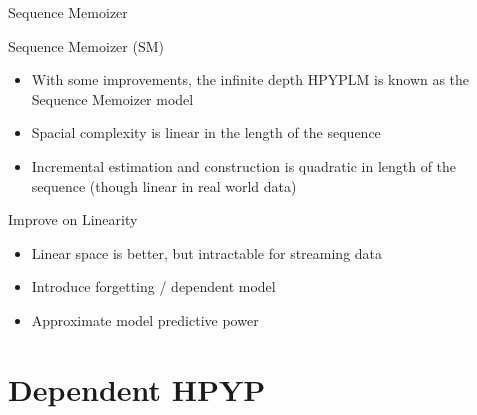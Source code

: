 \documentclass{beamer}
\begin{document}


\begin{frame}[t]{Sequence Memoizer \cite{Wood2009}}
	\begin{block}{Sequence Memoizer (SM)}
		\begin{itemize}
			\item With some improvements, the infinite depth HPYPLM is known as the Sequence Memoizer model \cite{Wood2009}
			\item Spacial complexity is linear in the length of the sequence
			\item Incremental estimation and construction is quadratic in length of the sequence (though linear in real world data) \cite{Gasthaus2010}
		\end{itemize}
	\end{block}

        \begin{block}{Improve on Linearity}
          \begin{itemize}
            \item Linear space is better, but intractable for streaming data
            \item Introduce forgetting / dependent model
            \item Approximate model predictive power
          \end{itemize}
        \end{block}
\end{frame}

\section{Dependent HPYP}
\end{document}
